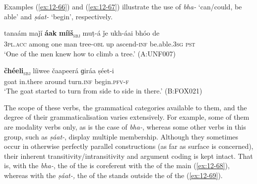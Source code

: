
Examples (\ref{ex:12-66}) and (\ref{ex:12-67}) illustrate the use of \textit{bha-} `can/could, be able' and \textit{ṣáat-} `begin', respectively.
\begin{exe}
\ex
\label{ex:12-66}
\gll tanaám maǰí {\ob}\textbf{áak} \textbf{míiš}{\cb}\textsubscript{\textsc{\upshape sbj}} muṭ-á ǰe ukh-áai bhóo de \\
\textsc{3pl.acc} among one man tree-\textsc{obl} up ascend-\textsc{inf}  be.able.\textsc{3sg} \textsc{pst} \\
\glt `One of the men knew how to climb a tree.' (A:UNF007)
\end{exe}
\begin{exe}
\ex
\label{ex:12-67}
\gll {\ob}\textbf{čhéeli}{\cb}\textsubscript{\textsc{\upshape sbj}} líiwee čaapeerá ɡiráa ṣéet-i \\
goat in.there around turn.\textsc{inf} begin.\textsc{pfv-f} \\
\glt `The goat started to turn from side to side in there.' (B:FOX021)
\end{exe}

The scope of these verbs, the grammatical categories available to them, and the degree of their grammaticalisation varies extensively. For example, some of them are modality verbs only, as is the case of \textit{bha-}, whereas some other verbs in this group, such as \textit{ṣáat-}, display multiple membership. Although they sometimes occur in otherwise perfectly parallel constructions (as far as surface  is concerned), their inherent transitivity/intransitivity and argument coding is kept intact. That is, with the   \textit{bha-}, the  of the  is coreferent with the  of the main  (\ref{ex:12-68}), whereas with the   \textit{ṣáat-,} the  of the  stands outside the  of the  (\ref{ex:12-69}).

